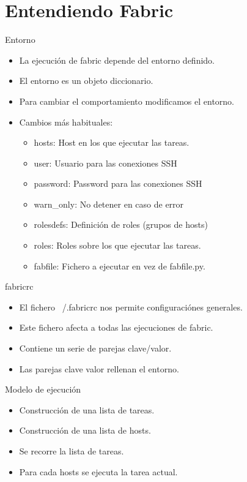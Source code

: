 \documentclass[10pt]{beamer}
\begin{document}
  \section*{Entendiendo Fabric}
  \begin{frame}{Entorno}
    \begin{itemize}
      \item La ejecución de fabric depende del entorno definido.
      \item El entorno es un objeto diccionario.
      \item Para cambiar el comportamiento modificamos el entorno.
      \item Cambios más habituales:
      \begin{itemize}
        \item hosts: Host en los que ejecutar las tareas.
        \item user: Usuario para las conexiones SSH
        \item password: Password para las conexiones SSH
        \item warn\_only: No detener en caso de error
        \item rolesdefs: Definición de roles (grupos de hosts)
        \item roles: Roles sobre los que ejecutar las tareas.
        \item fabfile: Fichero a ejecutar en vez de fabfile.py.
      \end{itemize}
    \end{itemize}
  \end{frame}

  \begin{frame}{fabricrc}
    \begin{itemize}
      \item El fichero ~/.fabricrc nos permite configuraciónes generales.
      \item Este fichero afecta a todas las ejecuciones de fabric.
      \item Contiene un serie de parejas clave/valor.
      \item Las parejas clave valor rellenan el entorno.
    \end{itemize}
  \end{frame}

  \begin{frame}{Modelo de ejecución}
    \begin{itemize}
      \item Construcción de una lista de tareas.
      \item Construcción de una lista de hosts.
      \item Se recorre la lista de tareas.
      \item Para cada hosts se ejecuta la tarea actual.
    \end{itemize}
  \end{frame}
\end{document}
